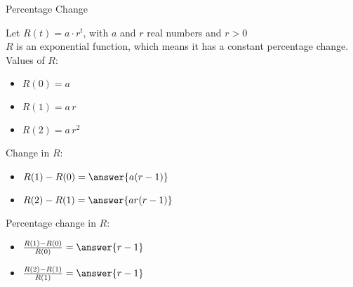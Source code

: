 \documentclass{ximera}
\begin{document}
\begin{example} Percentage Change



Let $R(t) = a \cdot r^t$, with $a$ and $r$ real numbers and $r>0$ \\

$R$ is an exponential function, which means it has a constant percentage change. \\

Values of $R$:

\begin{itemize}
\item $R(0) = a$

\item $R(1) = a \, r$

\item $R(2) = a \, r^2$
\end{itemize}



Change in $R$:

\begin{itemize}
\item $R(1) - R(0) = \answer{a (r-1)}$

\item $R(2) - R(1) = \answer{a r (r-1)}$

\end{itemize}





Percentage change in $R$:

\begin{itemize}
\item $\frac{R(1) - R(0)}{R(0)} = \answer{r-1}$

\item $\frac{R(2) - R(1)}{R(1)} = \answer{r-1}$

\end{itemize}


\end{example}
\end{document}
